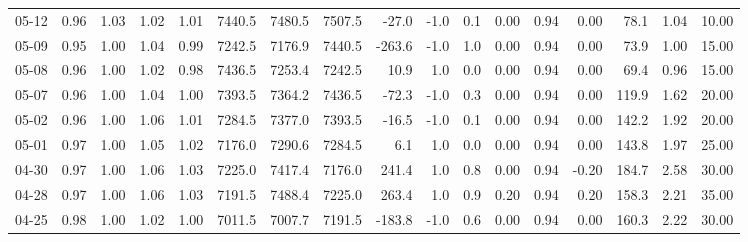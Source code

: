 \begin{threeparttable}
{\begin{tabular}{lrrrrrrrrrrrrrrrr}
  05-12 &         0.96 &           1.03 &          1.02 &          1.01 & 7440.5 & 7480.5 & 7507.5 &      -27.0 &                     -1.0 &                 0.1 &       0.00 &      0.94 &           0.00 &             78.1 &            1.04 &                  10.00 \\
  05-09 &         0.95 &           1.00 &          1.04 &          0.99 & 7242.5 & 7176.9 & 7440.5 &     -263.6 &                     -1.0 &                 1.0 &       0.00 &      0.94 &           0.00 &             73.9 &            1.00 &                  15.00 \\
  05-08 &         0.96 &           1.00 &          1.02 &          0.98 & 7436.5 & 7253.4 & 7242.5 &       10.9 &                      1.0 &                 0.0 &       0.00 &      0.94 &           0.00 &             69.4 &            0.96 &                  15.00 \\
  05-07 &         0.96 &           1.00 &          1.04 &          1.00 & 7393.5 & 7364.2 & 7436.5 &      -72.3 &                     -1.0 &                 0.3 &       0.00 &      0.94 &           0.00 &            119.9 &            1.62 &                  20.00 \\
  05-02 &         0.96 &           1.00 &          1.06 &          1.01 & 7284.5 & 7377.0 & 7393.5 &      -16.5 &                     -1.0 &                 0.1 &       0.00 &      0.94 &           0.00 &            142.2 &            1.92 &                  20.00 \\
  05-01 &         0.97 &           1.00 &          1.05 &          1.02 & 7176.0 & 7290.6 & 7284.5 &        6.1 &                      1.0 &                 0.0 &       0.00 &      0.94 &           0.00 &            143.8 &            1.97 &                  25.00 \\
  04-30 &         0.97 &           1.00 &          1.06 &          1.03 & 7225.0 & 7417.4 & 7176.0 &      241.4 &                      1.0 &                 0.8 &       0.00 &      0.94 &          -0.20 &            184.7 &            2.58 &                  30.00 \\
  04-28 &         0.97 &           1.00 &          1.06 &          1.03 & 7191.5 & 7488.4 & 7225.0 &      263.4 &                      1.0 &                 0.9 &       0.20 &      0.94 &           0.20 &            158.3 &            2.21 &                  35.00 \\
  04-25 &         0.98 &           1.00 &          1.02 &          1.00 & 7011.5 & 7007.7 & 7191.5 &     -183.8 &                     -1.0 &                 0.6 &       0.00 &      0.94 &           0.00 &            160.3 &            2.22 &                  30.00 \\

\end{tabular}}
\end{threeparttable}
